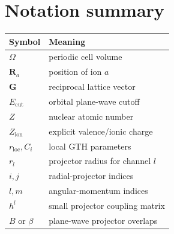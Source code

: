 \documentclass[10pt,twocolumn]{article}
\newcommand{\zion}{Z_{\mathrm{ion}}}
\newcommand{\gvec}{\mathbf G}
\newcommand{\Rvec}{\mathbf R}
\begin{document}
\section*{Notation summary}

\begin{center}
\footnotesize
\begin{tabular}{@{}ll@{}}
\toprule
Symbol & Meaning\\
\midrule
\(\Omega\) & periodic cell volume\\
\(\Rvec_a\) & position of ion \(a\)\\
\(\gvec\) & reciprocal lattice vector\\
\(E_{\mathrm{cut}}\) & orbital plane-wave cutoff\\
\(Z\) & nuclear atomic number\\
\(\zion\) & explicit valence/ionic charge\\
\(r_{\mathrm{loc}},C_i\) & local GTH parameters\\
\(r_l\) & projector radius for channel \(l\)\\
\(i,j\) & radial-projector indices\\
\(l,m\) & angular-momentum indices\\
\(h^l\) & small projector coupling matrix\\
\(B\) or \(\beta\) & plane-wave projector overlaps\\
\bottomrule
\end{tabular}
\end{center}
\end{document}
